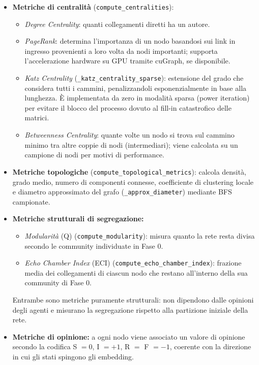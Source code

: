 \documentclass[11pt, a4paper]{article}
\begin{document}
\begin{itemize}[leftmargin=*]
    \item \textbf{Metriche di centralità} (\texttt{compute\_centralities}):
    \begin{itemize}
        \item \textit{Degree Centrality}: quanti collegamenti diretti ha un autore.
        \item \textit{PageRank}: determina l'importanza di un nodo basandosi sui link in ingresso provenienti a loro volta da nodi importanti; supporta l'accelerazione hardware su GPU tramite cuGraph, se disponibile.
        \item \textit{Katz Centrality} (\texttt{\_katz\_centrality\_sparse}): estensione del grado che considera tutti i cammini, penalizzandoli esponenzialmente in base alla lunghezza. È implementata da zero in modalità sparsa (power iteration) per evitare il blocco del processo dovuto al fill-in catastrofico delle matrici.
        \item \textit{Betweenness Centrality}: quante volte un nodo si trova sul cammino minimo tra altre coppie di nodi (intermediari); viene calcolata su un campione di nodi per motivi di performance.
    \end{itemize}
    \item \textbf{Metriche topologiche} (\texttt{compute\_topological\_metrics}): calcola densità, grado medio, numero di componenti connesse, coefficiente di clustering locale e diametro approssimato del grafo (\texttt{\_approx\_diameter}) mediante BFS campionate.
    \item \textbf{Metriche strutturali di segregazione:}
    \begin{itemize}
        \item \textit{Modularità} (Q) (\texttt{compute\_modularity}): misura quanto la rete resta divisa secondo le community individuate in Fase 0.
        \item \textit{Echo Chamber Index} (ECI) (\texttt{compute\_echo\_chamber\_index}): frazione media dei collegamenti di ciascun nodo che restano all'interno della sua community di Fase 0.
    \end{itemize}
    Entrambe sono metriche puramente strutturali: non dipendono dalle opinioni degli agenti e misurano la segregazione rispetto alla partizione iniziale della rete.
    \item \textbf{Metriche di opinione:} a ogni nodo viene associato un valore di opinione secondo la codifica S $= 0$, I $= +1$, R $=$ F $= -1$, coerente con la direzione in cui gli stati spingono gli embedding.

\end{itemize}
\end{document}

